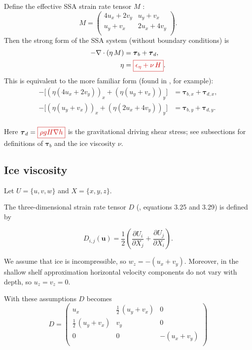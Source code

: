 \documentclass{amsart}
\newcommand{\U}{\mathbf{u}}
\newcommand{\T}{\boldsymbol{\tau}}
\newcommand{\diff}[2]{\ensuremath{\frac{\partial #1}{\partial #2}}}
\newcommand{\basalshearstress}[1]{\T_{b#1}}
\newcommand{\taub}{\basalshearstress{}}
\newcommand{\taubx}{\basalshearstress{,x}}
\newcommand{\tauby}{\basalshearstress{,y}}
\newcommand{\drivingstress}[1]{\T_{d#1}}
\newcommand{\taud}{\drivingstress{}}
\newcommand{\taudx}{\drivingstress{,x}}
\newcommand{\taudy}{\drivingstress{,y}}
\newcommand{\highlight}[1]{{\color{red!80!black} \fbox{$ \displaystyle #1 $} }}
\begin{document}
\newcommand{\Mux}{4u_x + 2v_y}
\newcommand{\Muy}{u_y + v_x}
\newcommand{\Mvx}{u_y + v_x}
\newcommand{\Mvy}{2u_x + 4v_y}
Define the effective SSA strain rate tensor $M$ \cite{Dukowiczetal2010}:
\begin{equation}
  \label{eq:1}
  M =
    \begin{pmatrix}
      \Mux & \Muy \\
      \Mvx & \Mvy \\
    \end{pmatrix}.
\end{equation}
Then the strong form of the SSA system (without boundary conditions) is
\begin{align}
  \label{eq:2}
  - \nabla\cdot(\eta\, M) & = \taub + \taud,\\
  \label{eq:3}
  \eta &= \highlight{ \epsilon_{\eta} + \nu\, H }.
\end{align}
This is equivalent to the more familiar form (found in \cite{SchoofStream}, for example):
\begin{align*}
 - \Big[ (\eta (\Mux))_x + (\eta (\Muy))_y \Big] & = \taubx + \taudx, \\
 - \Big[ (\eta (\Mvx))_x + (\eta (\Mvy))_y \Big] & = \tauby + \taudy.\\
\end{align*}

Here $\taud = \highlight{ \rho g H \nabla h }$ is the gravitational driving shear stress; see subsections for definitions of $\taub$ and the ice viscosity $\nu$.


\subsection{Ice viscosity}
\label{sec:ice-viscosity}

Let $U = \{u,v,w\}$ and $X = \{x, y, z\}$.

The three-dimensional strain rate tensor $D$ (\cite{GreveBlatter2009}, equations 3.25 and 3.29) is defined by

\begin{equation*}
  D_{i,j}(\U) = \frac 12 \left( \diff{U_i}{X_j} + \diff{U_j}{X_i} \right).
\end{equation*}

We assume that ice is incompressible, so $w_z = - (u_x + v_y)$. Moreover, in the shallow shelf approximation horizontal velocity components do not vary with depth, so $u_z = v_z = 0$.

With these assumptions $D$ becomes
\begin{equation*}
  D =
  \begin{pmatrix}
    u_x & \frac{1}{2}\,(u_y + v_x) & 0\\
    \frac{1}{2}\,(u_y + v_x) & v_y & 0\\
    0 & 0 & - (u_x + v_y)\\
  \end{pmatrix}
\end{equation*}
\end{document}
